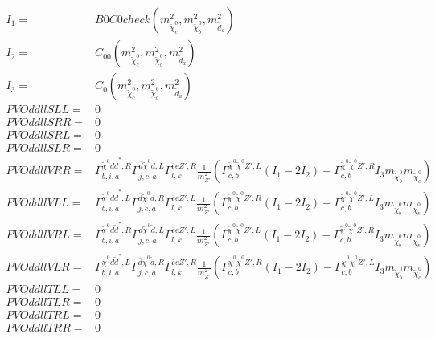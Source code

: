 \documentclass[A4,landscape]{article}
\begin{document}
\begin{align} 
I_1= & B0C0check(m^2_{\tilde{\chi}^0_{{c}}}, m^2_{\tilde{\chi}^0_{{b}}}, m^2_{\tilde{d}_{{a}}}) \\ 
I_2= & C_{00}(m^2_{\tilde{\chi}^0_{{c}}}, m^2_{\tilde{\chi}^0_{{b}}}, m^2_{\tilde{d}_{{a}}}) \\ 
I_3= & C_0(m^2_{\tilde{\chi}^0_{{c}}}, m^2_{\tilde{\chi}^0_{{b}}}, m^2_{\tilde{d}_{{a}}}) \\ 
  PVOddllSLL= & 0 \\ 
  PVOddllSRR= & 0 \\ 
  PVOddllSRL= & 0 \\ 
  PVOddllSLR= & 0 \\ 
  PVOddllVRR= &  \Gamma^{\tilde{\chi}^0 d \tilde{d}^*,R}_{b, i, a} \Gamma^{\bar{d}\tilde{\chi}^0 \tilde{d} ,L}_{j, c, a} \Gamma^{\bar{e}e {Z'} ,R}_{l, k} \frac{1}{m^2_{{Z'}}} (\Gamma^{\tilde{\chi}^0 \tilde{\chi}^0 {Z'} ,L}_{c, b} (I_1 - 2 I_2) - \Gamma^{\tilde{\chi}^0 \tilde{\chi}^0 {Z'} ,R}_{c, b} I_3 m_{\tilde{\chi}^0_{{b}}} m_{\tilde{\chi}^0_{{c}}}) \\ 
  PVOddllVLL= &  \Gamma^{\tilde{\chi}^0 d \tilde{d}^*,L}_{b, i, a} \Gamma^{\bar{d}\tilde{\chi}^0 \tilde{d} ,R}_{j, c, a} \Gamma^{\bar{e}e {Z'} ,L}_{l, k} \frac{1}{m^2_{{Z'}}} (\Gamma^{\tilde{\chi}^0 \tilde{\chi}^0 {Z'} ,R}_{c, b} (I_1 - 2 I_2) - \Gamma^{\tilde{\chi}^0 \tilde{\chi}^0 {Z'} ,L}_{c, b} I_3 m_{\tilde{\chi}^0_{{b}}} m_{\tilde{\chi}^0_{{c}}}) \\ 
  PVOddllVRL= &  \Gamma^{\tilde{\chi}^0 d \tilde{d}^*,R}_{b, i, a} \Gamma^{\bar{d}\tilde{\chi}^0 \tilde{d} ,L}_{j, c, a} \Gamma^{\bar{e}e {Z'} ,L}_{l, k} \frac{1}{m^2_{{Z'}}} (\Gamma^{\tilde{\chi}^0 \tilde{\chi}^0 {Z'} ,L}_{c, b} (I_1 - 2 I_2) - \Gamma^{\tilde{\chi}^0 \tilde{\chi}^0 {Z'} ,R}_{c, b} I_3 m_{\tilde{\chi}^0_{{b}}} m_{\tilde{\chi}^0_{{c}}}) \\ 
  PVOddllVLR= &  \Gamma^{\tilde{\chi}^0 d \tilde{d}^*,L}_{b, i, a} \Gamma^{\bar{d}\tilde{\chi}^0 \tilde{d} ,R}_{j, c, a} \Gamma^{\bar{e}e {Z'} ,R}_{l, k} \frac{1}{m^2_{{Z'}}} (\Gamma^{\tilde{\chi}^0 \tilde{\chi}^0 {Z'} ,R}_{c, b} (I_1 - 2 I_2) - \Gamma^{\tilde{\chi}^0 \tilde{\chi}^0 {Z'} ,L}_{c, b} I_3 m_{\tilde{\chi}^0_{{b}}} m_{\tilde{\chi}^0_{{c}}}) \\ 
  PVOddllTLL= & 0 \\ 
  PVOddllTLR= & 0 \\ 
  PVOddllTRL= & 0 \\ 
  PVOddllTRR= & 0 \\ 
\end{align} 
\end{document}
